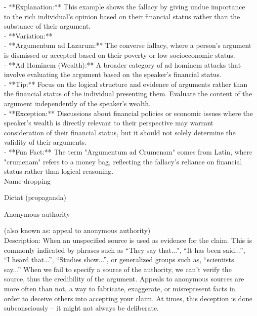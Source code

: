 \documentclass[a4paper,12pt,single,pdftex]{scrbook}
\begin{document}
    
      - **Explanation:** This example shows the fallacy by giving undue importance to the rich individual’s opinion based on their financial status rather than the substance of their argument.
    \\

    
      - **Variation:**
    \\

    
        - **Argumentum ad Lazarum:** The converse fallacy, where a person's argument is dismissed or accepted based on their poverty or low socioeconomic status.
    \\

    
        - **Ad Hominem (Wealth):** A broader category of ad hominem attacks that involve evaluating the argument based on the speaker’s financial status.
    \\

    
      - **Tip:** Focus on the logical structure and evidence of arguments rather than the financial status of the individual presenting them. Evaluate the content of the argument independently of the speaker’s wealth.
    \\

    
      - **Exception:** Discussions about financial policies or economic issues where the speaker’s wealth is directly relevant to their perspective may warrant consideration of their financial status, but it should not solely determine the validity of their arguments.
    \\

    
      - **Fun Fact:** The term "Argumentum ad Crumenam" comes from Latin, where "crumenam" refers to a money bag, reflecting the fallacy’s reliance on financial status rather than logical reasoning.
    \\

  

Name-dropping

Dictat (propaganda)

Anonymous authority
    
      (also known as: appeal to anonymous authority)
    \\

  
    Description: When an unspecified source is used as evidence for the claim.  This is commonly indicated by phrases such as “They say that...”, “It has been said...”, “I heard that...”, “Studies show...”, or generalized groups such as, “scientists say...”  When we fail to specify a source of the authority, we can’t verify the source, thus the credibility of the argument.  Appeals to anonymous sources are more often than not, a way to fabricate, exaggerate, or misrepresent facts in order to deceive others into accepting your claim.  At times, this deception is done subconsciously -- it might not always be deliberate.
\end{document}
